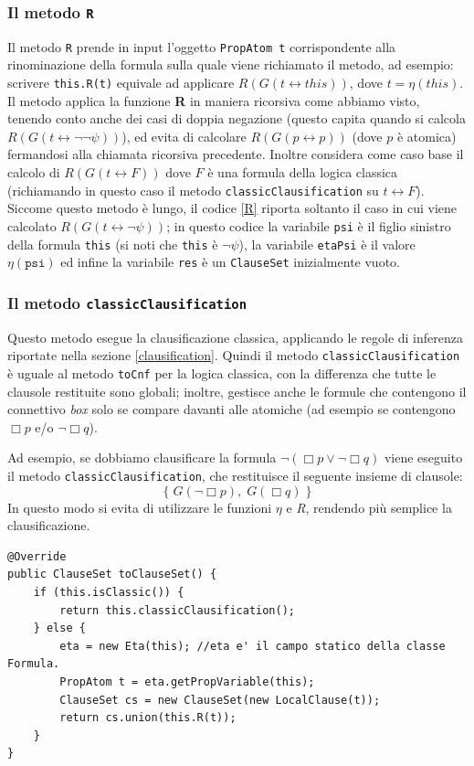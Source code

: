 \documentclass[a4paper,12pt]{report}
\newcommand{\tto} {\leftrightarrow}
\begin{document}
\subsubsection{Il metodo \texttt{R}}
Il metodo \texttt{R} prende in input l'oggetto \texttt{PropAtom t} corrispondente alla rinominazione della formula sulla quale viene richiamato il metodo, ad esempio: scrivere \texttt{this.R(t)} equivale ad applicare $R(G(t \tto this))$, dove $t = \eta(this)$. Il metodo applica la funzione \textbf{R} in maniera ricorsiva come abbiamo visto, tenendo conto anche dei casi di doppia negazione (questo capita quando si calcola $R(G(t \tto \lnot \lnot \psi))$), ed evita di calcolare $R(G(p \tto p))$ (dove $p$ è atomica) fermandosi alla chiamata ricorsiva precedente. Inoltre considera come caso base il calcolo di $R(G(t \tto F))$ dove $F$ è una formula della logica classica (richiamando in questo caso il metodo \texttt{classicClausification} su $t \tto F$). Siccome questo metodo è lungo, il codice \ref{R} riporta soltanto il caso in cui viene calcolato $R(G(t \tto \lnot \psi))$; in questo codice la variabile \texttt{psi} è il figlio sinistro della formula \texttt{this} (si noti che \texttt{this} è $\lnot \psi$), la variabile \texttt{etaPsi} è il valore $\eta(\texttt{psi})$ ed infine la variabile \texttt{res} è un \texttt{ClauseSet} inizialmente vuoto.

\subsubsection{Il metodo \texttt{classicClausification}}
\label{classicClausification}
Questo metodo esegue la clausificazione classica, applicando le regole di inferenza riportate nella sezione \ref{clausification}. Quindi il metodo \texttt{classicClausification} è uguale al metodo \texttt{toCnf} per la logica classica, con la differenza che tutte le clausole restituite sono globali; inoltre, gestisce anche le formule che contengono il connettivo \emph{box} solo se compare davanti alle atomiche (ad esempio se contengono $\Box p$ e/o $\lnot \Box q$).

Ad esempio, se dobbiamo clausificare la formula $\lnot(\Box p \lor \lnot \Box q)$ viene eseguito il metodo \texttt{classicClausification}, che restituisce il seguente insieme di clausole:
\[
    \{ \; G(\lnot \Box p), \; G(\Box q) \; \}
\]
In questo modo si evita di utilizzare le funzioni $\eta$ e \emph{R}, rendendo più semplice la clausificazione.

\begin{minipage}{\linewidth}
    \begin{lstlisting}[caption={Metodo \texttt{toClauseSet} della classe \texttt{CompoundFormula}}, label={toClauseSet}]
@Override
public ClauseSet toClauseSet() {
    if (this.isClassic()) {
        return this.classicClausification();
    } else {
        eta = new Eta(this); //eta e' il campo statico della classe Formula.
        PropAtom t = eta.getPropVariable(this);
        ClauseSet cs = new ClauseSet(new LocalClause(t));
        return cs.union(this.R(t));
    }
}
    \end{lstlisting}
\end{minipage}
\end{document}
